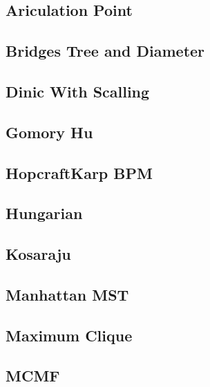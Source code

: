 \subsection{Ariculation Point}
\raggedbottom
\hrulefill
\subsection{Bridges Tree and Diameter}
\raggedbottom
\hrulefill
\subsection{Dinic With Scalling}
\raggedbottom
\hrulefill
\subsection{Gomory Hu}
\raggedbottom
\hrulefill
\subsection{HopcraftKarp BPM}
\raggedbottom
\hrulefill
\subsection{Hungarian}
\raggedbottom
\hrulefill
\subsection{Kosaraju}
\raggedbottom
\hrulefill
\subsection{Manhattan MST}
\raggedbottom
\hrulefill
\subsection{Maximum Clique}
\raggedbottom
\hrulefill
\subsection{MCMF}
\raggedbottom
\hrulefill
